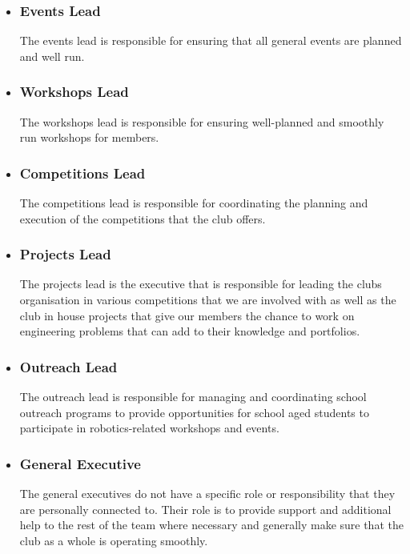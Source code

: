 \documentclass[a4paper,12pt]{report}
\begin{document}
\begin{itemize}
    \item \subsubsection{Events Lead}
    The events lead is responsible for ensuring that all general events are planned and well run. 
    
    \item \subsubsection{Workshops Lead}
    The workshops lead is responsible for ensuring well-planned and smoothly run workshops for members.

    \item \subsubsection{Competitions Lead}
    The competitions lead is responsible for coordinating the planning and execution of the competitions that the club offers.

    \item \subsubsection{Projects Lead}
    The projects lead is the executive that is responsible for leading the clubs organisation in various competitions that we are involved with as well as the club in house projects that give our members the chance to work on engineering problems that can add to their knowledge and portfolios.

    \item \subsubsection{Outreach Lead}
    The outreach lead is responsible for managing and coordinating school outreach programs to provide opportunities for school aged students to participate in robotics-related workshops and events.

    \item \subsubsection{General Executive}
    The general executives do not have a specific role or responsibility that they are personally connected to. Their role is to provide support and additional help to the rest of the team where necessary and generally make sure that the club as a whole is operating smoothly.
    
\end{itemize}
\end{document}
